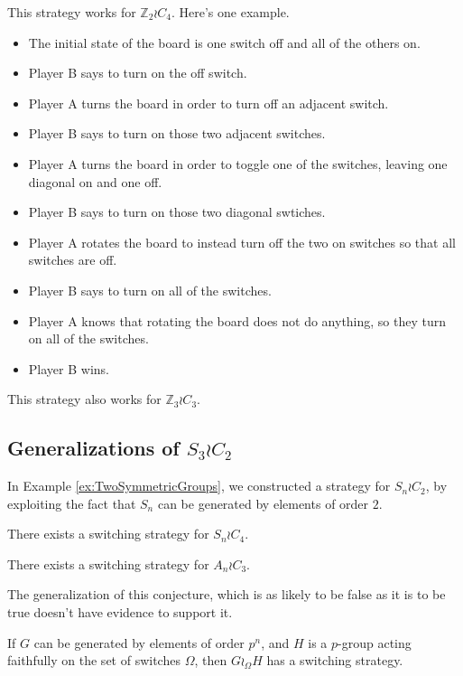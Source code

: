 \begin{example} This strategy works for $\mathbb Z_2 \wr C_4$. Here's one example.
  \begin{itemize}
    \item The initial state of the board is one switch off and all of the others on.
    \item Player B says to turn on the off switch.
    \item Player A turns the board in order to turn off an adjacent switch.
    \item Player B says to turn on those two adjacent switches.
    \item Player A turns the board in order to toggle one of the switches, leaving one diagonal on and one off.
    \item Player B says to turn on those two diagonal swtiches.
    \item Player A rotates the board to instead turn off the two on switches so that all switches are off.
    \item Player B says to turn on all of the switches.
    \item Player A knows that rotating the board does not do anything, so they turn on all of the switches.
    \item Player B wins.
  \end{itemize}
\end{example}

This strategy also works for $\mathbb Z_3 \wr C_3$.

\subsection{Generalizations of \texorpdfstring{$S_3 \wr C_2$}{Two interchangeable copies of the symmetric group}}

In Example \ref{ex:TwoSymmetricGroups}, we constructed a strategy for $S_n \wr C_2$,
by exploiting the fact that $S_n$ can be generated by elements of order $2$.

\begin{conjecture}
  There exists a switching strategy for $S_n \wr C_4$.
\end{conjecture}

\begin{conjecture}
  There exists a switching strategy for $A_n \wr C_3$.
\end{conjecture}

The generalization of this conjecture, which is as likely to be false as it is
to be true doesn't have evidence to support it.
\begin{conjecture}
  If $G$ can be generated by elements of order $p^n$, and $H$ is a $p$-group
  acting faithfully on the set of switches $\Omega$, then $G \wr_\Omega H$ has
  a switching strategy.
\end{conjecture}

